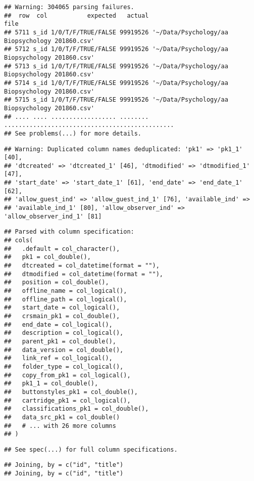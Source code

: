 \documentclass[
  ignorenonframetext,
]{beamer}
\begin{document}
\begin{frame}[fragile]
\begin{verbatim}
## Warning: 304065 parsing failures.
##  row  col           expected   actual                                            file
## 5711 s_id 1/0/T/F/TRUE/FALSE 99919526 '~/Data/Psychology/aa Biopsychology 201860.csv'
## 5712 s_id 1/0/T/F/TRUE/FALSE 99919526 '~/Data/Psychology/aa Biopsychology 201860.csv'
## 5713 s_id 1/0/T/F/TRUE/FALSE 99919526 '~/Data/Psychology/aa Biopsychology 201860.csv'
## 5714 s_id 1/0/T/F/TRUE/FALSE 99919526 '~/Data/Psychology/aa Biopsychology 201860.csv'
## 5715 s_id 1/0/T/F/TRUE/FALSE 99919526 '~/Data/Psychology/aa Biopsychology 201860.csv'
## .... .... .................. ........ ...............................................
## See problems(...) for more details.
\end{verbatim}

\begin{verbatim}
## Warning: Duplicated column names deduplicated: 'pk1' => 'pk1_1' [40],
## 'dtcreated' => 'dtcreated_1' [46], 'dtmodified' => 'dtmodified_1' [47],
## 'start_date' => 'start_date_1' [61], 'end_date' => 'end_date_1' [62],
## 'allow_guest_ind' => 'allow_guest_ind_1' [76], 'available_ind' =>
## 'available_ind_1' [80], 'allow_observer_ind' => 'allow_observer_ind_1' [81]
\end{verbatim}

\begin{verbatim}
## Parsed with column specification:
## cols(
##   .default = col_character(),
##   pk1 = col_double(),
##   dtcreated = col_datetime(format = ""),
##   dtmodified = col_datetime(format = ""),
##   position = col_double(),
##   offline_name = col_logical(),
##   offline_path = col_logical(),
##   start_date = col_logical(),
##   crsmain_pk1 = col_double(),
##   end_date = col_logical(),
##   description = col_logical(),
##   parent_pk1 = col_double(),
##   data_version = col_double(),
##   link_ref = col_logical(),
##   folder_type = col_logical(),
##   copy_from_pk1 = col_logical(),
##   pk1_1 = col_double(),
##   buttonstyles_pk1 = col_double(),
##   cartridge_pk1 = col_logical(),
##   classifications_pk1 = col_double(),
##   data_src_pk1 = col_double()
##   # ... with 26 more columns
## )
\end{verbatim}

\begin{verbatim}
## See spec(...) for full column specifications.
\end{verbatim}

\begin{verbatim}
## Joining, by = c("id", "title")
## Joining, by = c("id", "title")
\end{verbatim}

\end{frame}
\end{document}
